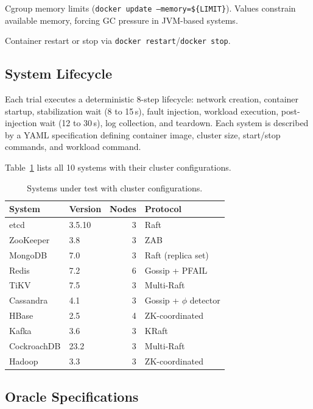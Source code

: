  Cgroup memory limits
(\texttt{docker update --memory=\$\{LIMIT\}}).
Values constrain available memory, forcing GC pressure in JVM-based systems.

 Container restart or stop via
\texttt{docker restart}/\texttt{docker stop}.

\subsection{System Lifecycle}

Each trial executes a deterministic 8-step lifecycle: network creation,
container startup, stabilization wait (8 to 15\,s), fault injection, workload
execution, post-injection wait (12 to 30\,s), log collection, and teardown.
Each system is described by a YAML specification defining container image,
cluster size, start/stop commands, and workload command.

Table~\ref{tab:systems} lists all 10 systems with their cluster configurations.

\begin{table}[t]
\centering
\caption{Systems under test with cluster configurations.}
\label{tab:systems}
\small
\begin{tabular}{@{}llrl@{}}
\toprule
\textbf{System} & \textbf{Version} & \textbf{Nodes} & \textbf{Protocol} \\
\midrule
etcd & 3.5.10 & 3 & Raft \\
ZooKeeper & 3.8 & 3 & ZAB \\
MongoDB & 7.0 & 3 & Raft (replica set) \\
Redis & 7.2 & 6 & Gossip + PFAIL \\
TiKV & 7.5 & 3 & Multi-Raft \\
Cassandra & 4.1 & 3 & Gossip + $\phi$ detector \\
HBase & 2.5 & 4 & ZK-coordinated \\
Kafka & 3.6 & 3 & KRaft \\
CockroachDB & 23.2 & 3 & Multi-Raft \\
Hadoop & 3.3 & 3 & ZK-coordinated \\
\bottomrule
\end{tabular}
\end{table}

\subsection{Oracle Specifications}

